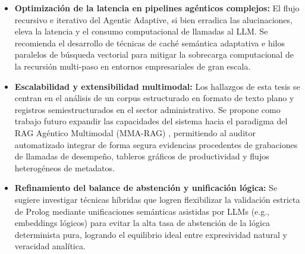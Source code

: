 \begin{itemize}
    \item \textbf{Optimización de la latencia en pipelines agénticos complejos:} El flujo recursivo e iterativo del Agentic Adaptive, si bien erradica las alucinaciones, eleva la latencia y el consumo computacional de llamadas al LLM. Se recomienda el desarrollo de técnicas de caché semántica adaptativa e hilos paralelos de búsqueda vectorial para mitigar la sobrecarga computacional de la recursión multi-paso en entornos empresariales de gran escala.

    \item \textbf{Escalabilidad y extensibilidad multimodal:} Los hallazgos de esta tesis se centran en el análisis de un corpus estructurado en formato de texto plano y registros semiestructurados en el sector administrativo. Se propone como trabajo futuro expandir las capacidades del sistema hacia el paradigma del RAG Agéntico Multimodal (MMA-RAG) \cite{mmarag2025}, permitiendo al auditor automatizado integrar de forma segura evidencias procedentes de grabaciones de llamadas de desempeño, tableros gráficos de productividad y flujos heterogéneos de metadatos.

    \item \textbf{Refinamiento del balance de abstención y unificación lógica:} Se sugiere investigar técnicas híbridas que logren flexibilizar la validación estricta de Prolog mediante unificaciones semánticas asistidas por LLMs (e.g., embeddings lógicos) para evitar la alta tasa de abstención de la lógica determinista pura, logrando el equilibrio ideal entre expresividad natural y veracidad analítica.
\end{itemize}